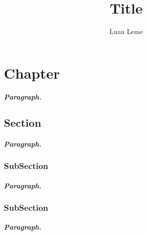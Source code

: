 \documentclass[11pt, a4paper]{article}
\title{Title}
\author{Luan Leme}
\begin{document}
\maketitle

\chapter{Chapter}

\paragraph{Paragraph.}

\section{Section}

\paragraph{Paragraph.}

\subsection{SubSection}

\paragraph{Paragraph.}

\subsection{SubSection}

\paragraph{Paragraph.}
\end{document}
